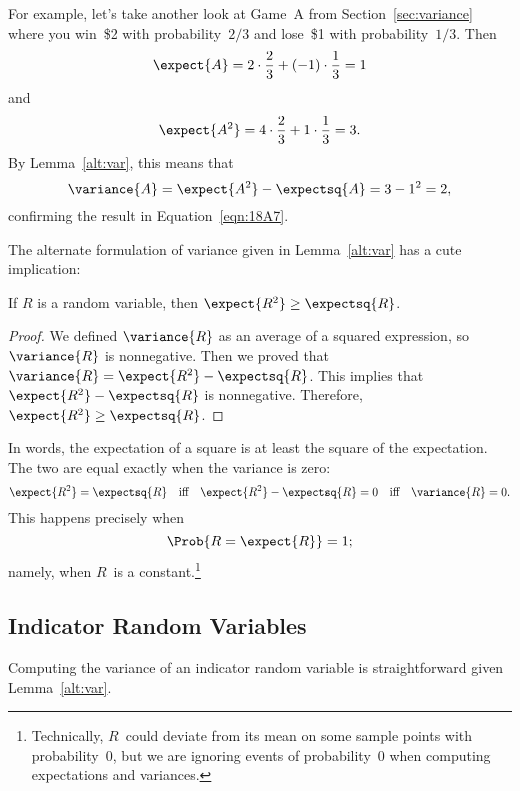 For example, let's take another look at Game~A from
Section~\ref{sec:variance} where you win~\$2 with probability~$2/3$
and lose~\$1 with probability~$1/3$.  Then
\begin{equation*}
    \expect{A} = 2 \cdot \frac{2}{3} + (-1) \cdot \frac{1}{3} = 1
\end{equation*}
and
\begin{equation*}
    \expect{A^2} = 4 \cdot \frac{2}{3} + 1 \cdot \frac{1}{3} = 3.
\end{equation*}
By Lemma~\ref{alt:var}, this means that
\begin{equation*}
\variance{A}
    = \expect{A^2} - \expectsq{A}
    = 3 - 1^2 
    = 2,
\end{equation*}
confirming the result in Equation~\ref{eqn:18A7}.

The alternate formulation of variance given in Lemma~\ref{alt:var} has
a cute implication:
\begin{corollary}
If $R$ is a random variable, then $\expect{R^2} \geq \expectsq{R}$.
\end{corollary}
\begin{proof}
We defined $\variance{R}$ as an average of a squared expression, so
$\variance{R}$ is nonnegative.  Then we proved that $\variance{R} =
\expect{R^2} - \expectsq{R}$.  This implies that $\expect{R^2} -
\expectsq{R}$ is nonnegative.  Therefore, $\expect{R^2} \geq
\expectsq{R}$.
\end{proof}

In words, the expectation of a square is at least the square of the
expectation. The two are equal exactly when the variance is zero:
\begin{equation*}
\expect{R^2} = \expectsq{R}
    \quad \text{iff}\quad \expect{R^2} - \expectsq{R} = 0
    \quad \text{iff}\quad \variance{R} = 0.
\end{equation*}
This happens precisely when
\begin{equation*}
    \Prob{R = \expect{R}} = 1;
\end{equation*}
namely, when $R$~is a constant.\footnote{Technically, $R$~could deviate
  from its mean on some sample points with probability~0, but we are
  ignoring events of probability~0 when computing expectations and
  variances.}

\subsection{Indicator Random Variables}

Computing the variance of an indicator random variable is
straightforward given Lemma~\ref{alt:var}.

